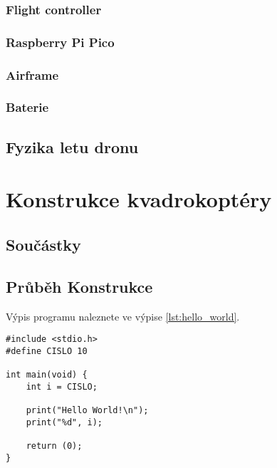 \documentclass[12pt]{report}
\begin{document}
\lipsum[2]

\section{Flight controller}
\lipsum[3]

\section{Raspberry Pi Pico}

\section{Airframe}

\section{Baterie}
\lipsum[3]

\chapter{Fyzika letu dronu}

\lipsum[1]

\part{Konstrukce kvadrokoptéry} %

\chapter{Součástky}
\lipsum[1]	

\chapter{Průběh Konstrukce}

\lipsum[1]	

Výpis programu   naleznete ve výpise \ref{lst:hello_world}.

\begin{lstlisting}[title={Program hello.c}, caption={hello.c}, label={lst:hello_world}]
#include <stdio.h>
#define CISLO 10

int main(void) {
	int i = CISLO;

	print("Hello World!\n");
	print("%d", i);

	return (0);
}
\end{lstlisting}
\end{document}
